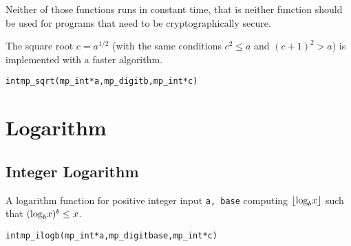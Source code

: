 \documentclass[synpaper]{book}
\def\log{{\rm log}}
\newcommand{\floor}[1]{\left\lfloor{#1}\right\rfloor}
\begin{document}
Neither of those functions runs in constant time, that is neither function should be used for programs that need to be cryptographically secure.

The square root  $c = a^{1/2}$ (with the same conditions $c^2 \le a$ and $(c+1)^2 > a$) is implemented with a faster algorithm.

\begin{alltt}
int mp_sqrt (mp_int * a, mp_digit b, mp_int * c)
\end{alltt}


\chapter{Logarithm}
\section{Integer Logarithm}
A logarithm function for positive integer input \texttt{a, base} computing  $\floor{\log_bx}$ such that $(\log_b x)^b \le x$.
\begin{alltt}
int mp_ilogb(mp_int *a, mp_digit base, mp_int *c)
\end{alltt}
\end{document}
